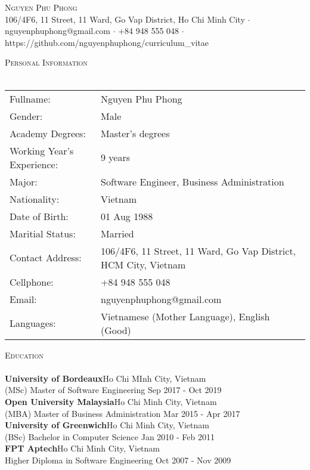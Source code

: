 \documentclass[a4paper]{article}
\newcommand{\lineunder} {
    \vspace*{-8pt} \\
    \hspace*{-18pt} \hrulefill \\
}
\newcommand{\header} [1] {
    {\hspace*{-18pt}\vspace*{6pt} \textsc{#1}}
    \vspace*{-6pt} \lineunder
}
\begin{document}
\vspace*{-40pt}

    

\vspace*{-10pt}
\begin{center}
	{\Huge \scshape {Nguyen Phu Phong}}\\
	106/4F6, 11 Street, 11 Ward, Go Vap District, Ho Chi Minh City $\cdot$ nguyenphuphong@gmail.com $\cdot$ +84 948 555 048 $\cdot$ https://github.com/nguyenphuphong/curriculum\_vitae\\
\end{center}

\header{Personal Information}
\begin{tabular}{ l l }
	Fullname:                    & Nguyen Phu Phong \\
	Gender:                     & Male \\
	Academy Degrees: 			& Master's degrees \\
	Working Year's Experience: & 9 years \\
	Major: & Software Engineer, Business Administration \\
	Nationality:               & Vietnam \\
	Date of Birth:                       & 01 Aug 1988 \\
	Maritial Status:                     & Married                                              \\
	Contact Address:                    & 106/4F6, 11 Street, 11 Ward, Go Vap District, HCM City, Vietnam \\
	Cellphone:                         & +84 948 555 048 \\
	Email:			& nguyenphuphong@gmail.com \\
	Languages: & Vietnamese (Mother Language), English (Good)
\end{tabular}
\vspace{2mm}

\header{Education}
\textbf{University of Bordeaux}\hfill Ho Chi MInh City, Vietnam\\
(MSc) Master of Software Engineering \hfill Sep 2017 - Oct 2019\\
\vspace{2mm}
\textbf{Open University Malaysia}\hfill Ho Chi Minh City, Vietnam\\
(MBA) Master of Business Administration \hfill Mar 2015 - Apr 2017\\
\vspace{2mm}
\textbf{University of Greenwich}\hfill Ho Chi Minh City, Vietnam\\
(BSc) Bachelor in Computer Science \hfill Jan 2010 - Feb 2011\\
\vspace{2mm}
\textbf{FPT Aptech}\hfill Ho Chi Minh City, Vietnam\\
Higher Diploma in Software Engineering \hfill Oct 2007 - Nov 2009\\
\vspace{2mm}
\end{document}
